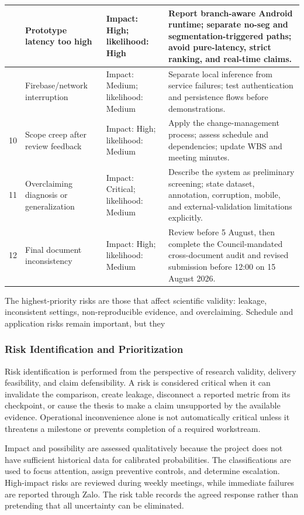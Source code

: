 \documentclass[12pt,a4paper]{report}
\begin{document}
\begin{longtable}{|>{\centering\arraybackslash}p{1.00cm}|>{\centering\arraybackslash}p{4.80cm}|>{\centering\arraybackslash}p{3.40cm}|>{\centering\arraybackslash}p{6.20cm}|}
8 & Prototype latency too high & Impact: High; likelihood: High & Report branch-aware Android runtime; separate no-seg and segmentation-triggered paths; avoid pure-latency, strict ranking, and real-time claims. \\ \hline
9 & Firebase/network interruption & Impact: Medium; likelihood: Medium & Separate local inference from service failures; test authentication and persistence flows before demonstrations. \\ \hline
\rowcolor{RevisionYellow}10 & Scope creep after review feedback & Impact: High; likelihood: Medium & Apply the change-management process; assess schedule and dependencies; update WBS and meeting minutes. \\ \hline
\rowcolor{RevisionYellow}11 & Overclaiming diagnosis or generalization & Impact: Critical; likelihood: Medium & Describe the system as preliminary screening; state dataset, annotation, corruption, mobile, and external-validation limitations explicitly. \\ \hline
\rowcolor{RevisionYellow}12 & Final document inconsistency & Impact: High; likelihood: Medium & Review before 5 August, then complete the Council-mandated cross-document audit and revised submission before 12:00 on 15 August 2026. \\ \hline
\end{longtable}
\endgroup
The highest-priority risks are those that affect scientific validity: leakage, inconsistent settings, non-reproducible evidence, and overclaiming. Schedule and application risks remain important, but they\par
\subsubsection{Risk Identification and Prioritization}
Risk identification is performed from the perspective of research validity, delivery feasibility, and claim defensibility. A risk is considered critical when it can invalidate the comparison, create leakage, disconnect a reported metric from its checkpoint, or cause the thesis to make a claim unsupported by the available evidence. Operational inconvenience alone is not automatically critical unless it threatens a milestone or prevents completion of a required workstream.\par
Impact and possibility are assessed qualitatively because the project does not have sufficient historical data for calibrated probabilities. The classifications are used to focus attention, assign preventive controls, and determine escalation. High-impact risks are reviewed during weekly meetings, while immediate failures are reported through Zalo. The risk table records the agreed response rather than pretending that all uncertainty can be eliminated.\par
\end{document}
